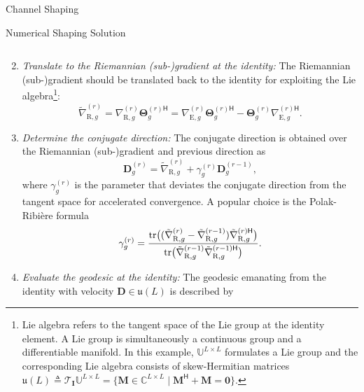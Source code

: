 \documentclass[journal]{IEEEtran}
\begin{document}
\begin{section}{Channel Shaping}
\begin{subsection}{Numerical Shaping Solution}
\begin{enumerate}
\begin{equation}
				\end{equation}
			\item \emph{Translate to the Riemannian (sub-)gradient at the identity:} The Riemannian (sub-)gradient should be translated back to the identity for exploiting the Lie algebra\footnote{Lie algebra refers to the tangent space of the Lie group at the identity element. A Lie group is simultaneously a continuous group and a differentiable manifold. In this example, $\mathbb{U}^{L \times L}$ formulates a Lie group and the corresponding Lie algebra consists of skew-Hermitian matrices $\mathfrak{u}(L) \triangleq \mathcal{T}_{\mathbf{I}}\mathbb{U}^{L \times L} = \{\mathbf{M} \in \mathbb{C}^{L \times L} \mid \mathbf{M}^\mathsf{H} + \mathbf{M} = \mathbf{0}\}$.}:
				\begin{equation}
					\label{eq:gradient_riem_tran}
					\tilde{\nabla}_{\mathrm{R},g}^{(r)} = \nabla_{\mathrm{R},g}^{(r)} \mathbf{\Theta}_g^{(r)\mathsf{H}} = \nabla_{\mathrm{E},g}^{(r)} \mathbf{\Theta}_g^{(r)\mathsf{H}} - \mathbf{\Theta}_g^{(r)} {\nabla_{\mathrm{E},g}^{(r)\mathsf{H}}}.
				\end{equation}
			\item \emph{Determine the conjugate direction:} The conjugate direction is obtained over the Riemannian (sub-)gradient and previous direction as
				\begin{equation}
					\label{eq:conjugate_dirn_geod}
					{\mathbf{D}}_g^{(r)} = \tilde{\nabla}_{\mathrm{R},g}^{(r)} + {\gamma}_g^{(r)} {\mathbf{D}}_g^{(r-1)},
				\end{equation}
				where $\gamma_g^{(r)}$ is the parameter that deviates the conjugate direction from the tangent space for accelerated convergence. A popular choice is the Polak-Ribi\`{e}re formula \cite{Hager2006}
				\begin{equation}
					\label{eq:conjugate_parm_geod}
					{\gamma}_g^{(r)} = \frac{\tr\bigl((\tilde{\nabla}_{\mathrm{R},g}^{(r)} - \tilde{\nabla}_{\mathrm{R},g}^{(r-1)}) {\tilde{\nabla}_{\mathrm{R},g}^{(r)\mathsf{H}}}\bigr)}{\tr\bigl(\tilde{\nabla}_{\mathrm{R},g}^{(r-1)} {\tilde{\nabla}_{\mathrm{R},g}^{(r-1)\mathsf{H}}}\bigr)}. %
				\end{equation}
			\item \emph{Evaluate the geodesic at the identity:} The geodesic emanating from the identity with velocity $\mathbf{D} \in \mathfrak{u}(L)$ is described by
				\begin{equation}
					\label{eq:geodesic_iden}

\end{equation}
\end{enumerate}
\end{subsection}
\end{section}
\end{document}
